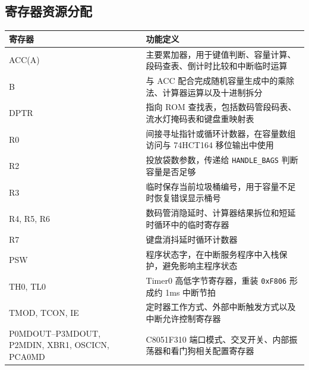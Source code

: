 \documentclass[12pt,a4paper]{article}
\begin{document}
\subsection{寄存器资源分配}
\begin{table}[H]
    \centering
    \small
    \begin{tabular}{|p{3.8cm}|p{11.2cm}|}
        \hline
        寄存器 & 功能定义 \\
        \hline
        ACC(A) & 主要累加器，用于键值判断、容量计算、段码查表、倒计时比较和中断临时运算 \\
        \hline
        B & 与 ACC 配合完成随机容量生成中的乘除法、计算器运算以及十进制拆分 \\
        \hline
        DPTR & 指向 ROM 查找表，包括数码管段码表、流水灯掩码表和键盘重映射表 \\
        \hline
        R0 & 间接寻址指针或循环计数器，在容量数组访问与 74HCT164 移位输出中使用 \\
        \hline
        R2 & 投放袋数参数，传递给 \texttt{HANDLE\_BAGS} 判断容量是否足够 \\
        \hline
        R3 & 临时保存当前垃圾桶编号，用于容量不足时恢复错误显示桶号 \\
        \hline
        R4, R5, R6 & 数码管消隐延时、计算器结果拆位和短延时循环中的临时寄存器 \\
        \hline
        R7 & 键盘消抖延时循环计数器 \\
        \hline
        PSW & 程序状态字，在中断服务程序中入栈保护，避免影响主程序状态 \\
        \hline
        TH0, TL0 & Timer0 高低字节寄存器，重装 \texttt{0xF806} 形成约 1ms 中断节拍 \\
        \hline
        TMOD, TCON, IE & 定时器工作方式、外部中断触发方式以及中断允许控制寄存器 \\
        \hline
        P0MDOUT--P3MDOUT, P2MDIN, XBR1, OSCICN, PCA0MD & C8051F310 端口模式、交叉开关、内部振荡器和看门狗相关配置寄存器 \\
        \hline
    \end{tabular}
\end{table}
\end{document}
